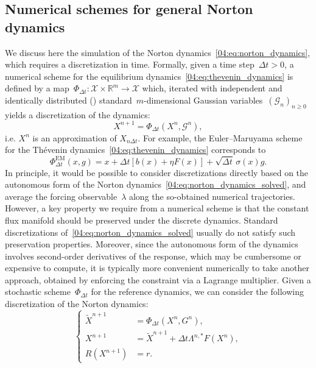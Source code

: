 \subsection{Numerical schemes for general Norton dynamics}\label{04:subsec:discr_gal}
We discuss here the simulation of the Norton dynamics~\eqref{04:eq:norton_dynamics}, which requires a discretization in time.
Formally, given a time step~$\Delta t >0$, a numerical scheme for the equilibrium dynamics~\eqref{04:eq:thevenin_dynamics} is defined by a map~$\Phi_{\Delta t} : \mathcal X \times \mathbb{R}^m \to \mathcal X$
which, iterated with independent and identically distributed (\iid) standard~$m$-dimensional Gaussian variables~$(\mathcal G_n)_{n\geq 0}$ yields a discretization of the dynamics:
\begin{equation}
    X^{n+1} = \Phi_{\Delta t}(X^n,\mathcal G^n),
\end{equation}
i.e. $X^n$ is an approximation of $X_{n\Delta t}$.
For example, the Euler--Maruyama scheme for the Th\'evenin dynamics~\eqref{04:eq:thevenin_dynamics} corresponds to
\begin{equation}
    \label{04:eq:em_scheme}
    \Phi^{\mathrm{EM}}_{\Delta t}(x,g)=x + \Delta t \left[b(x) +\eta F(x)\right] +\sqrt{\Delta t}\,\sigma(x)g.
\end{equation}
In principle, it would be possible to consider discretizations directly based on the autonomous form of the Norton dynamics~\eqref{04:eq:norton_dynamics_solved}, and average the forcing observable~$\lambda$ along the so-obtained numerical trajectories.
However, a key property we require from a numerical scheme is that the constant flux manifold should be preserved under the discrete dynamics. Standard discretizations of~\eqref{04:eq:norton_dynamics_solved} usually do not satisfy such preservation properties. 
Moreover, since the autonomous form of the dynamics involves second-order derivatives of the response, which may be cumbersome or expensive to compute, it is typically more convenient numerically to take another approach, obtained by enforcing the constraint via a Lagrange multiplier.
Given a stochastic scheme~$\Phi_{\Delta t}$ for the reference dynamics, we can consider the following discretization of the Norton dynamics:
\begin{equation}
    \label{04:eq:scheme_norton_general_sde}
    \left\{\begin{aligned}
        \widetilde{X}^{n+1} &= \Phi_{\Delta t}(X^n, G^n),\\
        X^{n+1} &= \widetilde{X}^{n+1} +\Delta t\Lambda^{n,*} F(X^n),\\
        R(X^{n+1}) &=r.
    \end{aligned}\right.
\end{equation}
